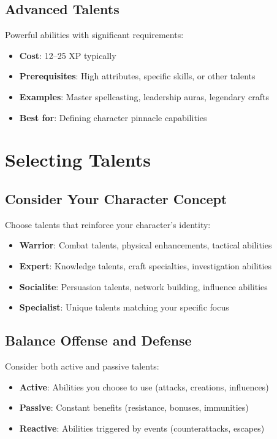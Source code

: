 \begin{multicols}{2}
\subsection*{Advanced Talents}
Powerful abilities with significant requirements:
\begin{itemize}
\item \textbf{Cost}: 12--25 XP typically
\item \textbf{Prerequisites}: High attributes, specific skills, or other talents
\item \textbf{Examples}: Master spellcasting, leadership auras, legendary crafts
\item \textbf{Best for}: Defining character pinnacle capabilities
\end{itemize}

\section{Selecting Talents}

\subsection*{Consider Your Character Concept}
Choose talents that reinforce your character's identity:
\begin{itemize}
\item \textbf{Warrior}: Combat talents, physical enhancements, tactical abilities
\item \textbf{Expert}: Knowledge talents, craft specialties, investigation abilities
\item \textbf{Socialite}: Persuasion talents, network building, influence abilities
\item \textbf{Specialist}: Unique talents matching your specific focus
\end{itemize}

\subsection*{Balance Offense and Defense}
Consider both active and passive talents:
\begin{itemize}
\item \textbf{Active}: Abilities you choose to use (attacks, creations, influences)
\item \textbf{Passive}: Constant benefits (resistance, bonuses, immunities)
\item \textbf{Reactive}: Abilities triggered by events (counterattacks, escapes)
\end{itemize}


\end{multicols}

